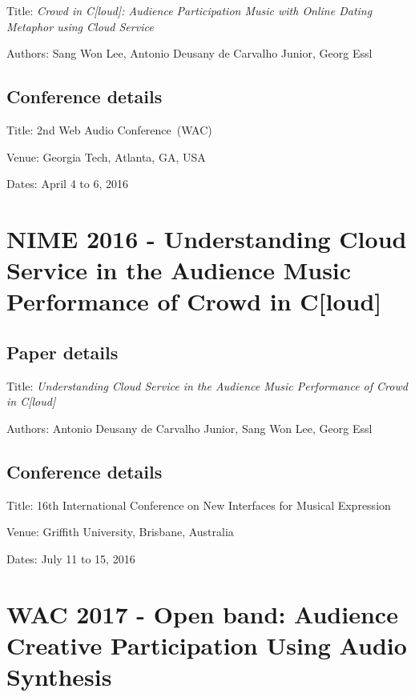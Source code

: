 Title: \textit{Crowd in C[loud]: Audience Participation Music with Online Dating Metaphor using Cloud Service}

Authors: Sang Won Lee, Antonio Deusany de Carvalho Junior, Georg Essl

\subsection*{Conference details}

Title: 2nd Web Audio Conference~(WAC)

Venue: Georgia Tech, Atlanta, GA, USA

Dates: April 4 to 6, 2016




\section{NIME 2016 - Understanding Cloud Service in the Audience Music Performance of Crowd in C[loud]}
\label{ape:papernime2016}

\subsection*{Paper details}

Title: \textit{Understanding Cloud Service in the Audience Music Performance of Crowd in C[loud]}

Authors: Antonio Deusany de Carvalho Junior, Sang Won Lee, Georg Essl

\subsection*{Conference details}

Title: 16th International Conference on New Interfaces for Musical Expression

Venue: Griffith University, Brisbane, Australia

Dates: July 11 to 15, 2016



\section{WAC 2017 - Open band: Audience Creative Participation Using Audio Synthesis}
\label{ape:paperwac2017}

